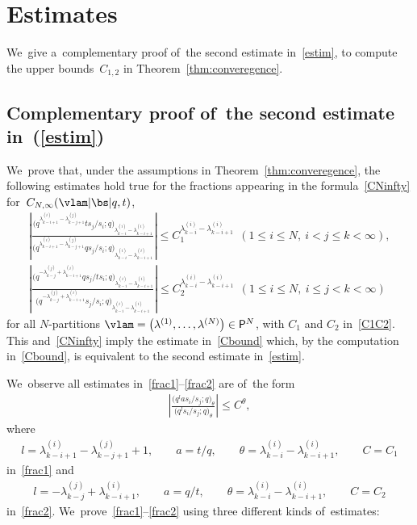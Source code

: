 \section{Estimates}\label{app:estim}
{\sloppy
We~give a~complementary proof of~the second estimate in~\eqref{estim}, to compute the upper bounds~$C_{1,2}$ in Theorem~\ref{thm:converegence}.

}

\subsection[Complementary proof of~the second estimate in (3.13)]{Complementary proof of~the second estimate in~(\ref{estim})}
\label{app:proofestim}
We~prove that, under the assumptions in Theorem~\ref{thm:converegence}, the following estimates hold true for the fractions appearing in the formula~\eqref{CNinfty} for~$C_{N,\infty}(\vlam|\bs|q,t)$,
\begin{gather}
\label{frac1}
\left|\frac{\big(q^{\lambda^{(i)}_{k-i+1} - \lambda^{(j)}_{k-j+1}}ts_{j}/s_i;q\big)_{\lambda^{(i)}_{k-i}-\lambda^{(i)}_{k-i+1}}}{\big(q^{\lambda^{(i)}_{k-i+1} - \lambda^{(j)}_{k-j+1}}qs_{j}/s_i;q\big)_{\lambda^{(i)}_{k-i}-\lambda^{(i)}_{k-i+1}}}\right|\leq C_1^{\lambda^{(i)}_{k-i}-\lambda^{(i)}_{k-i+1}} \ \ (1\leq i\leq N,\ i<j\leq k<\infty) ,\!\!\!
\\
\label{frac2}
\left| \frac{\big(q^{-\lambda^{(j)}_{k-j}+\lambda^{(i)}_{k-i+1}}qs_{j}/ts_i ;q\big)_{\lambda^{(i)}_{k-i}-\lambda^{(i)}_{k-i+1}}}{\big(q^{-\lambda^{(j)}_{k-j}+\lambda^{(i)}_{k-i+1}}s_{j}/s_i ;q\big)_{\lambda^{(i)}_{k-i}-\lambda^{(i)}_{k-i+1}}} \right| \leq C_2^{\lambda^{(i)}_{k-i}-\lambda^{(i)}_{k-i+1}} \ \
(1\leq i\leq N,\ i\leq j< k<\infty)\!\!
\end{gather}
for all $N$-partitions $\vlam=\big(\lambda^{(1)},\dots,\lambda^{(N)}\big)\in\mathsf{P}^N$, with $C_1$ and $C_2$ in~\eqref{C1C2}.
This and~\eqref{CNinfty} imply the estimate in~\eqref{Cbound} which, by the computation in~\eqref{Cbound}, is equivalent to the second estimate in~\eqref{estim}.

We~observe all estimates in~\eqref{frac1}--\eqref{frac2} are of~the form
\begin{gather*}
\left|\frac{\big(q^{l}as_i/s_j;q\big)_\theta}{\big(q^l s_i/s_j;q\big)_\theta}\right|\leq C^\theta,
\end{gather*}
where
\begin{gather}
\label{first}
l= \lambda^{(i)}_{k-i+1} - \lambda^{(j)}_{k-j+1}+1,\qquad
a=t/q,\qquad
\theta= \lambda^{(i)}_{k-i}-\lambda^{(i)}_{k-i+1},\qquad
C=C_1
\end{gather}
in~\eqref{frac1} and
\begin{gather}
\label{second}
l=-\lambda^{(j)}_{k-j}+\lambda^{(i)}_{k-i+1},\qquad
a=q/t,\qquad
\theta= \lambda^{(i)}_{k-i}-\lambda^{(i)}_{k-i+1},\qquad
C=C_2
\end{gather}
in~\eqref{frac2}. We~prove~\eqref{frac1}--\eqref{frac2} using three different kinds of~estimates:

